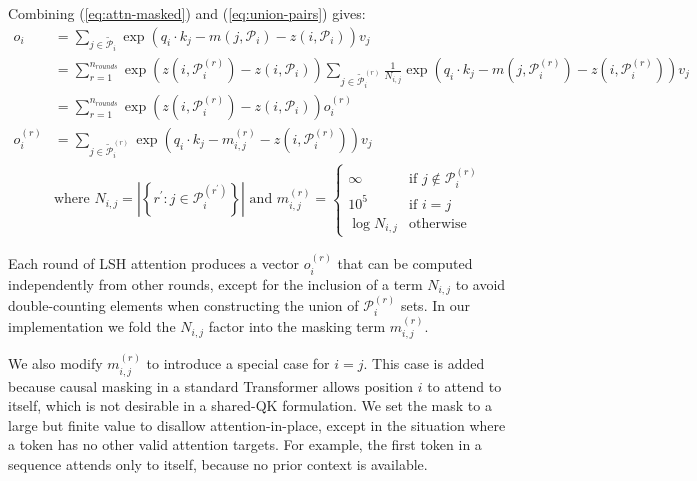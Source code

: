 \documentclass{article} %
\def\pair{\mathcal{P}}
\def\extpair{\widetilde{\mathcal{P}}}
\begin{document}
Combining (\ref{eq:attn-masked}) and (\ref{eq:union-pairs}) gives:
\begin{align}
    o_i &= \sum_{j \in \extpair_i} \exp \left(q_i \cdot k_j - m(j, \pair_i) - z(i, \pair_i) \right) v_j \\
    &= \sum_{r=1}^{n_{rounds}} \exp \left(z(i, \pair^{(r)}_i) - z(i, \pair_i)\right) \sum_{j \in \extpair^{(r)}_i} \frac{1}{N_{i,j}}\exp\left(q_i \cdot k_j - m(j, \pair^{(r)}_i) - z(i, \pair^{(r)}_i)\right) v_j \\
    &= \sum_{r=1}^{n_{rounds}} \exp \left(z(i, \pair^{(r)}_i) - z(i, \pair_i)\right) o^{(r)}_i\\
    o^{(r)}_i &=\sum_{j \in \extpair^{(r)}_i} \exp\left(q_i \cdot k_j - m^{(r)}_{i,j} - z(i, \pair^{(r)}_i)\right) v_j \\
    &\text{where } N_{i,j} = \left|\left\{r^\prime : j \in \pair^{(r^\prime)}_i\right\}\right|
    \text{ and } m^{(r)}_{i, j} = \begin{cases}
    \infty & \text{if } j \notin \pair^{(r)}_i\\
    10^5  & \text{if } i = j\\
    \log N_{i,j} & \text{otherwise}
    \end{cases}
\end{align}

Each round of LSH attention produces a vector $o^{(r)}_i$ that can be computed independently from other rounds, except for the inclusion of a term $N_{i,j}$ to avoid double-counting elements when constructing the union of $\pair^{(r)}_i$ sets. In our implementation we fold the $N_{i,j}$ factor into the masking term $m^{(r)}_{i,j}$.

We also modify $m^{(r)}_{i,j}$ to introduce a special case for $i = j$.
This case is added because causal masking in a standard Transformer allows position $i$ to attend to itself, which is not desirable in a shared-QK formulation. We set the mask to a large but finite value to disallow attention-in-place, except in the situation where a token has no other valid attention targets. For example, the first token in a sequence attends only to itself, because no prior context is available.
\end{document}
